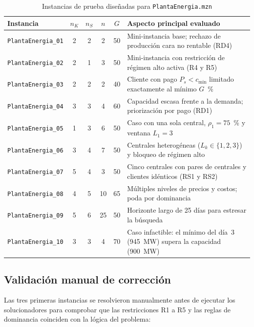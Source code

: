 \begin{table}[htbp]
    \caption{Instancias de prueba dise\~nadas para \texttt{PlantaEnergia.mzn}}
    \label{tab:plantas-instancias}
    \small
    \begin{tabularx}{\textwidth}{@{}lccccL@{}}
        \toprule
        Instancia & $n_K$ & $n_S$ & $n$ & $G$ & Aspecto principal evaluado \\
        \midrule
        \texttt{PlantaEnergia\_01} & 2 & 2 & 2  & 50 & Mini-instancia base; rechazo de producci\'on cara no rentable (RD4) \\
        \texttt{PlantaEnergia\_02} & 2 & 1 & 3  & 50 & Mini-instancia con restricci\'on de r\'egimen alto activa (R4 y R5) \\
        \texttt{PlantaEnergia\_03} & 2 & 2 & 2  & 40 & Cliente con pago $P_s < c_{\min}$ limitado exactamente al m\'inimo $G$~\% \\
        \texttt{PlantaEnergia\_04} & 3 & 3 & 4  & 60 & Capacidad escasa frente a la demanda; priorizaci\'on por pago (RD1) \\
        \texttt{PlantaEnergia\_05} & 1 & 3 & 6  & 50 & Caso con una sola central, $\rho_1 = 75$~\% y ventana $L_1 = 3$ \\
        \texttt{PlantaEnergia\_06} & 3 & 4 & 7  & 50 & Centrales heterog\'eneas ($L_k \in \{1, 2, 3\}$) y bloqueo de r\'egimen alto \\
        \texttt{PlantaEnergia\_07} & 5 & 4 & 3  & 50 & Cinco centrales con pares de centrales y clientes id\'enticos (RS1 y RS2) \\
        \texttt{PlantaEnergia\_08} & 4 & 5 & 10 & 65 & M\'ultiples niveles de precios y costos; poda por dominancia \\
        \texttt{PlantaEnergia\_09} & 5 & 6 & 25 & 50 & Horizonte largo de 25 d\'ias para estresar la b\'usqueda \\
        \texttt{PlantaEnergia\_10} & 3 & 3 & 4  & 70 & Caso infactible: el m\'inimo del d\'ia~3 (945~MW) supera la capacidad (900~MW) \\
        \bottomrule
    \end{tabularx}
\end{table}

\subsection{Validaci\'on manual de correcci\'on}

Las tres primeras instancias se resolvieron manualmente antes de ejecutar los solucionadores para comprobar que las restricciones R1 a R5 y las reglas de dominancia coinciden con la l\'ogica del problema:

